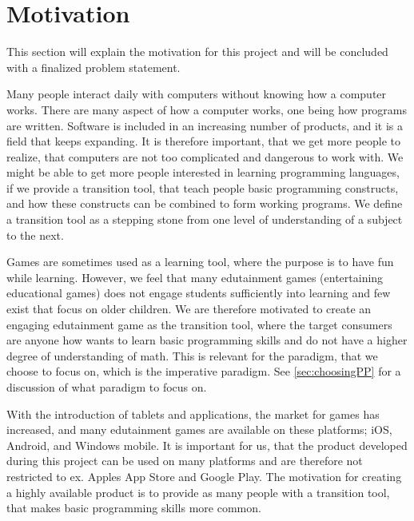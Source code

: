 \section{Motivation}
\label{sec:motivation}

This section will explain the motivation for this project and will be concluded with a finalized problem statement.\newline

Many people interact daily with computers without knowing how a computer works.
There are many aspect of how a computer works, one being how programs are written.
Software is included in an increasing number of products, and it is a field that keeps expanding.
It is therefore important, that we get more people to realize, that computers are not too complicated and dangerous to work with.
We might be able to get more people interested in learning programming languages, if we provide a transition tool, that teach people basic programming constructs, and how these constructs can be combined to form working programs.
We define a transition tool as a stepping stone from one level of understanding of a subject to the next.\newline

Games are sometimes used as a learning tool, where the purpose is to have fun while learning.
However, we feel that many edutainment games (entertaining educational games) does not engage students sufficiently into learning and few exist that focus on older children. 
We are therefore motivated to create an engaging edutainment game as the transition tool, where the target consumers are anyone how wants to learn basic programming skills and do not have a higher degree of understanding of math. This is relevant for the paradigm, that we choose to focus on, which is the imperative paradigm. See \autoref{sec:choosingPP} for a discussion of what paradigm to focus on.\newline

With the introduction of tablets and applications, the market for games has increased, and many edutainment games are available on these platforms; iOS, Android, and Windows mobile.
It is important for us, that the product developed during this project can be used on many platforms and are therefore not restricted to ex. Apples App Store and Google Play.
The motivation for creating a highly available product is to provide as many people with a transition tool, that makes basic programming skills more common.\newline

